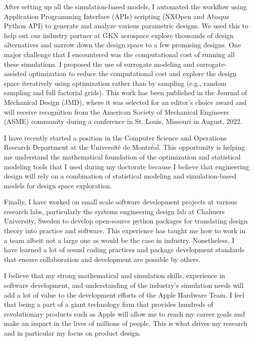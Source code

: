 \documentclass[12pt]{article} %
\begin{document}
\medskip %

After setting up all the simulation-based models, I automated the workflow using Application Programming Interface (APIs) scripting (NXOpen and Abaqus Python API)  to generate and analyze various parametric designs. We used this to help out our industry partner at GKN aerospace explore thousands of design alternatives and narrow down the design space to a few promising designs. One major challenge that I encountered was the computational cost of running all these simulations. I proposed the use of surrogate modeling and surrogate-assisted optimization to reduce the computational cost and explore the design space iteratively using optimization rather than by sampling (e.g., random sampling and full factorial grids). This work has been published in the Journal of Mechanical Design (JMD), where it was selected for an editor's choice award and will receive recognition from the American Society of Mechanical Engineers (ASME) community during a conference in St. Louis, Missouri in August, 2022.

\medskip %

I have recently started a position in the Computer Science and Operations Research Department at the Universit\'{e} de Montr\'{e}al. This opportunity is helping me understand the mathematical foundation of the optimization and statistical modeling tools that I used during my doctorate because I believe that engineering design will rely on a combination of statistical modeling and simulation-based models for design space exploration.

\medskip %

Finally, I have worked on small scale software development projects at various research labs, particularly the systems engineering design lab at Chalmers University, Sweden to develop open-source python packages for translating design theory into practice and software. This experience has taught me how to work in a team albeit not a large one as would be the case in industry. Nonetheless, I have learned a lot of sound coding practices and package development standards that ensure collaboration and development are possible by others.

\medskip %

I believe that my strong mathematical and simulation skills, experience in software development, and understanding of the industry's simulation needs will add a lot of value to the development efforts of the Apple Hardware Team. I feel that being a part of a giant technology firm that provides hundreds of revolutionary products such as Apple will allow me to reach my career goals and make an impact in the lives of millions of people. This is what drives my research and in particular my focus on product design.
\end{document}
